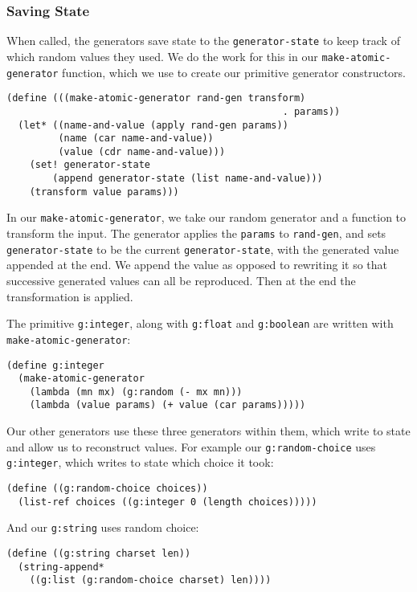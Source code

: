 \subsubsection{Saving State}

When called, the generators save state to the \verb|generator-state| to keep track of which random values they used. We do the work for this in our \verb|make-atomic-generator| function, which we use to create our primitive generator constructors.

\begin{lstlisting}
(define (((make-atomic-generator rand-gen transform) 
                                                . params))
  (let* ((name-and-value (apply rand-gen params))
         (name (car name-and-value))
         (value (cdr name-and-value)))
    (set! generator-state 
        (append generator-state (list name-and-value)))
    (transform value params)))
\end{lstlisting}

In our \verb|make-atomic-generator|, we take our random generator and a function to transform the input. The generator applies the \verb|params| to \verb|rand-gen|, and sets \verb|generator-state| to be the current \verb|generator-state|, with the generated value appended at the end. We append the value as opposed to rewriting it so that successive generated values can all be reproduced. Then at the end the transformation is applied.

The primitive \verb|g:integer|, along with \verb|g:float| and \verb|g:boolean| are written with \verb|make-atomic-generator|:
\begin{lstlisting}
(define g:integer
  (make-atomic-generator
    (lambda (mn mx) (g:random (- mx mn)))
    (lambda (value params) (+ value (car params)))))
\end{lstlisting}

Our other generators use these three generators within them, which write to state and allow us to reconstruct values. For example our \verb|g:random-choice| uses \verb|g:integer|, which writes to state which choice it took:

\begin{lstlisting}
(define ((g:random-choice choices))
  (list-ref choices ((g:integer 0 (length choices)))))
\end{lstlisting}

And our \verb|g:string| uses random choice:
\begin{lstlisting}
(define ((g:string charset len))
  (string-append*
    ((g:list (g:random-choice charset) len))))
\end{lstlisting}

